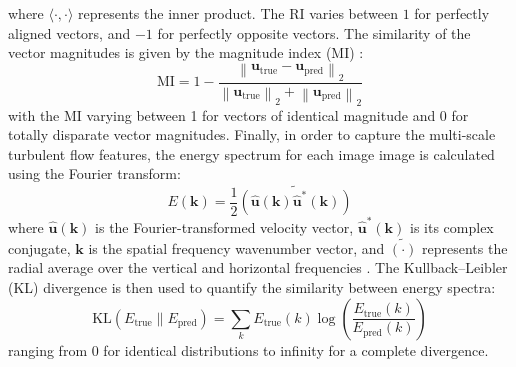 \documentclass{article}
\begin{document}
where $\langle \cdot, \cdot \rangle$ represents the inner product. The RI varies between $1$ for perfectly aligned vectors, and $-1$ for perfectly opposite vectors. The similarity of the vector magnitudes is given by the magnitude index (MI) \cite{hu2015large}:
\begin{equation}
    \textrm{MI} = 1-\frac{\left\|\boldsymbol{u}_{\mathrm{true}}-\boldsymbol{u}_{\mathrm{pred}}\right\|_2}{\left\|\boldsymbol{u}_{\mathrm{true}}\right\|_2+\left\|\boldsymbol{u}_{\mathrm{pred}}\right\|_2}
\end{equation}
with the MI varying between 1 for vectors of identical magnitude and 0 for totally disparate vector magnitudes. Finally, in order to capture the multi-scale turbulent flow features, the energy spectrum for each image image is calculated using the Fourier transform:
\begin{equation}
    E(\boldsymbol{k}) = \frac{1}{2}\widetilde{\left(\hat{\boldsymbol{u}}(\boldsymbol{k}) \hat{\boldsymbol{u}}^*(\boldsymbol{k})\right)}
\end{equation}
where $\hat{\boldsymbol{u}}(\boldsymbol{k})$ is the Fourier-transformed velocity vector, $\hat{\boldsymbol{u}}^*(\boldsymbol{k})$ is its complex conjugate, $\boldsymbol{k}$ is the spatial frequency wavenumber vector, and $\widetilde{(\cdot)}$ represents the radial average over the vertical and horizontal frequencies \cite{li2023multi}. The Kullback–Leibler (KL) divergence is then used to quantify the similarity between energy spectra:
\begin{equation}
    \textrm{KL}(E_{\mathrm{true}} \| E_{\mathrm{pred}})=\sum_k E_{\mathrm{true}}(k) \log \left(\frac{E_{\mathrm{true}}(k)}{E_{\mathrm{pred}}(k)}\right)
\end{equation}
ranging from 0 for identical distributions to infinity for a complete divergence.
\end{document}
